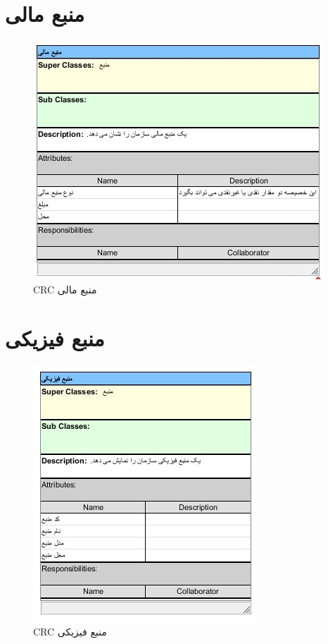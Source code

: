 \section{منبع مالی}
\begin{figure}[H]
	\centering
	\includegraphics[scale=1]{img/crc/FinancialResource}
	\caption{CRC منبع مالی }
\end{figure}

\section{منبع فیزیکی}
\begin{figure}[H]
	\centering
	\includegraphics[scale=1]{img/crc/PhysicalResource}
	\caption{CRC منبع فیزیکی }
\end{figure}


